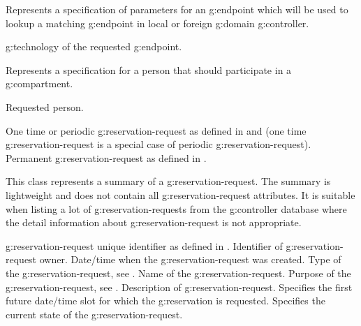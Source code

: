 \begin{Api}
Represents a specification of parameters for an \gls{g:endpoint} which will be used to lookup a matching \gls{g:endpoint} in local or foreign \gls{g:domain} \gls{g:controller}.
\begin{ApiClassAttributes}
 \Gls{g:technology} of the requested \gls{g:endpoint}.
\end{ApiClassAttributes}

Represents a specification for a person that should participate in a \gls{g:compartment}.
\begin{ApiClassAttributes}
 Requested person.
\end{ApiClassAttributes}

\begin{ApiEnumValues}
 One time or periodic \gls{g:reservation-request} as defined in  and  (one time \gls{g:reservation-request} is a special case of periodic \gls{g:reservation-request}).
 Permanent \gls{g:reservation-request} as defined in .
\end{ApiEnumValues}

This class represents a summary of a \gls{g:reservation-request}. The summary is lightweight and does not contain all \gls{g:reservation-request} attributes. It is suitable when listing a lot of \glspl{g:reservation-request} from the \gls{g:controller} database where the detail information about \gls{g:reservation-request} is not appropriate.
\begin{ApiClassAttributes}
 \Gls{g:reservation-request} unique identifier as defined in .
 Identifier of \gls{g:reservation-request} owner.
 Date/time when the \gls{g:reservation-request} was created.
 Type of the \gls{g:reservation-request}, see .
 Name of the \gls{g:reservation-request}.
 Purpose of the \gls{g:reservation-request}, see .
 Description of \gls{g:reservation-request}.
 Specifies the first future date/time slot for which the \gls{g:reservation} is requested.
 Specifies the current state of the \gls{g:reservation-request}. 
\end{ApiClassAttributes}


\end{Api}
